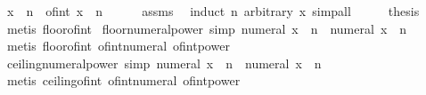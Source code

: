 \begin{isabellebody}
\ {\isachardoublequoteopen}x\ {\isacharcircum}{\kern0pt}\ n\ {\isacharequal}{\kern0pt}\ of{\isacharunderscore}{\kern0pt}int\ {\isacharparenleft}{\kern0pt}{\isasymlfloor}x{\isasymrfloor}\ {\isacharcircum}{\kern0pt}\ n{\isacharparenright}{\kern0pt}{\isachardoublequoteclose}\isanewline
\ \ \ \ \isamarkupfalse%
\ assms\ \isamarkupfalse%
\ {\isacharparenleft}{\kern0pt}induct\ n\ arbitrary{\isacharcolon}{\kern0pt}\ x{\isacharparenright}{\kern0pt}\ simp{\isacharunderscore}{\kern0pt}all\isanewline
\ \ \isamarkupfalse%
\ \isamarkupfalse%
\ {\isacharquery}{\kern0pt}thesis\ \isamarkupfalse%
\ {\isacharparenleft}{\kern0pt}metis\ floor{\isacharunderscore}{\kern0pt}of{\isacharunderscore}{\kern0pt}int{\isacharparenright}{\kern0pt}\isanewline
{}\isamarkupfalse%
%
\endisatagproof
{\isafoldproof}%
%
\isadelimproof
\isanewline
%
\endisadelimproof
\isanewline
{}\isamarkupfalse%
\ floor{\isacharunderscore}{\kern0pt}numeral{\isacharunderscore}{\kern0pt}power\ {\isacharbrackleft}{\kern0pt}simp{\isacharbrackright}{\kern0pt}{\isacharcolon}{\kern0pt}\ {\isachardoublequoteopen}{\isasymlfloor}numeral\ x\ {\isacharcircum}{\kern0pt}\ n{\isasymrfloor}\ {\isacharequal}{\kern0pt}\ numeral\ x\ {\isacharcircum}{\kern0pt}\ n{\isachardoublequoteclose}\isanewline
%
\isadelimproof
\ \ %
\endisadelimproof
%
\isatagproof
{}\isamarkupfalse%
\ {\isacharparenleft}{\kern0pt}metis\ floor{\isacharunderscore}{\kern0pt}of{\isacharunderscore}{\kern0pt}int\ of{\isacharunderscore}{\kern0pt}int{\isacharunderscore}{\kern0pt}numeral\ of{\isacharunderscore}{\kern0pt}int{\isacharunderscore}{\kern0pt}power{\isacharparenright}{\kern0pt}%
\endisatagproof
{\isafoldproof}%
%
\isadelimproof
\isanewline
%
\endisadelimproof
\isanewline
{}\isamarkupfalse%
\ ceiling{\isacharunderscore}{\kern0pt}numeral{\isacharunderscore}{\kern0pt}power\ {\isacharbrackleft}{\kern0pt}simp{\isacharbrackright}{\kern0pt}{\isacharcolon}{\kern0pt}\ {\isachardoublequoteopen}{\isasymlceil}numeral\ x\ {\isacharcircum}{\kern0pt}\ n{\isasymrceil}\ {\isacharequal}{\kern0pt}\ numeral\ x\ {\isacharcircum}{\kern0pt}\ n{\isachardoublequoteclose}\isanewline
%
\isadelimproof
\ \ %
\endisadelimproof
%
\isatagproof
{}\isamarkupfalse%
\ {\isacharparenleft}{\kern0pt}metis\ ceiling{\isacharunderscore}{\kern0pt}of{\isacharunderscore}{\kern0pt}int\ of{\isacharunderscore}{\kern0pt}int{\isacharunderscore}{\kern0pt}numeral\ of{\isacharunderscore}{\kern0pt}int{\isacharunderscore}{\kern0pt}power{\isacharparenright}{\kern0pt}%

\end{isabellebody}
